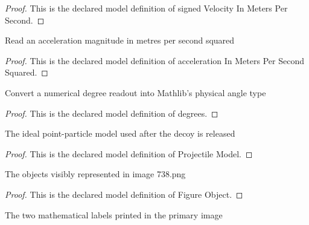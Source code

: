 \begin{proof}
  This is the declared model definition of signed Velocity In Meters Per Second.
\end{proof}
\begin{definition}
  \label{def:physics:phyx-mini-0738:phyxminiproblems-problemphyxmini0738-accelerationinmeterspersecondsquared}
  Read an acceleration magnitude in metres per second squared
\end{definition}
\begin{proof}
  This is the declared model definition of acceleration In Meters Per Second Squared.
\end{proof}
\begin{definition}[degrees]
  \label{def:physics:phyx-mini-0738:phyxminiproblems-problemphyxmini0738-degrees}
  Convert a numerical degree readout into Mathlib's physical angle type
\end{definition}
\begin{proof}
  This is the declared model definition of degrees.
\end{proof}
\begin{definition}
  \label{def:physics:phyx-mini-0738:phyxminiproblems-problemphyxmini0738-projectilemodel}
  The ideal point-particle model used after the decoy is released
\end{definition}
\begin{proof}
  This is the declared model definition of Projectile Model.
\end{proof}
\begin{definition}
  \label{def:physics:phyx-mini-0738:phyxminiproblems-problemphyxmini0738-figureobject}
  The objects visibly represented in image 738.png
\end{definition}
\begin{proof}
  This is the declared model definition of Figure Object.
\end{proof}
\begin{definition}
  \label{def:physics:phyx-mini-0738:phyxminiproblems-problemphyxmini0738-figurelabel}
  The two mathematical labels printed in the primary image
\end{definition}

